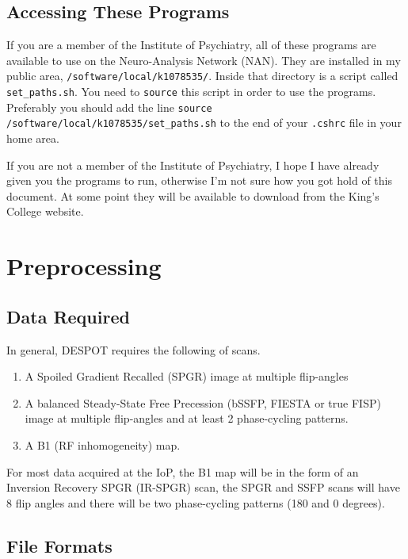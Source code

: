 \documentclass{report}
\begin{document}
\printbibliography[heading=subbibliography]

\section{Accessing These Programs}

If you are a member of the Institute of Psychiatry, all of these programs are available to use on the Neuro-Analysis Network (NAN). They are installed in my public area, \texttt{/software/local/k1078535/}. Inside that directory is a script called \texttt{set\_paths.sh}. You need to \texttt{source} this script in order to use the programs. Preferably you should add the line \texttt{source /software/local/k1078535/set\_paths.sh} to the end of your \texttt{.cshrc} file in your home area.

If you are not a member of the Institute of Psychiatry, I hope I have already given you the programs to run, otherwise I'm not sure how you got hold of this document. At some point they will be available to download from the King's College website.

\chapter{Preprocessing}

\section{Data Required}

In general, DESPOT requires the following of scans.
\begin{enumerate} \itemsep1pt \parskip0pt 
  \item A Spoiled Gradient Recalled (SPGR) image at multiple flip-angles
  \item A balanced Steady-State Free Precession (bSSFP, FIESTA or true FISP) image at multiple flip-angles and at least 2 phase-cycling patterns.
  \item A B1 (RF inhomogeneity) map.
\end{enumerate}

For most data acquired at the IoP, the B1 map will be in the form of an Inversion Recovery SPGR (IR-SPGR) scan, the SPGR and SSFP scans will have 8 flip angles and there will be two phase-cycling patterns (180 and 0 degrees).

\section{File Formats}
\end{document}
